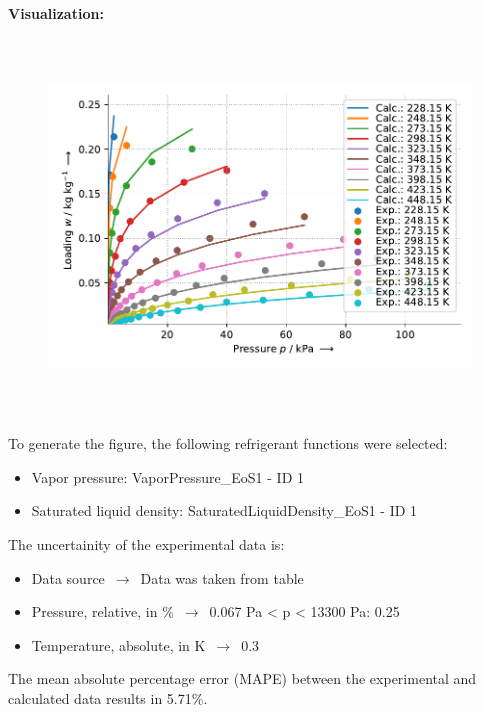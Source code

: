 \textbf{Visualization:}
%
\begin{figure}[!htp]
{\noindent\includegraphics[height=10cm, keepaspectratio]{figs/ads/ads_CarbonDioxide_zeolite_pellet_5A_Toth_1.pdf}}
\end{figure}
%

To generate the figure, the following refrigerant functions were selected:
\begin{itemize}
\item Vapor pressure: VaporPressure\_EoS1 - ID 1
\item Saturated liquid density: SaturatedLiquidDensity\_EoS1 - ID 1
\end{itemize}

The uncertainity of the experimental data is:
\begin{itemize}
\item Data source $\,\to\,$ Data was taken from table
\item Pressure, relative, in \% $\,\to\,$ 0.067 Pa < p < 13300 Pa: 0.25%
\item Temperature, absolute, in $\si{\kelvin}$ $\,\to\,$ 0.3
\end{itemize}

The mean absolute percentage error (MAPE) between the experimental and calculated data results in 5.71\%.
\FloatBarrier
\newpage
